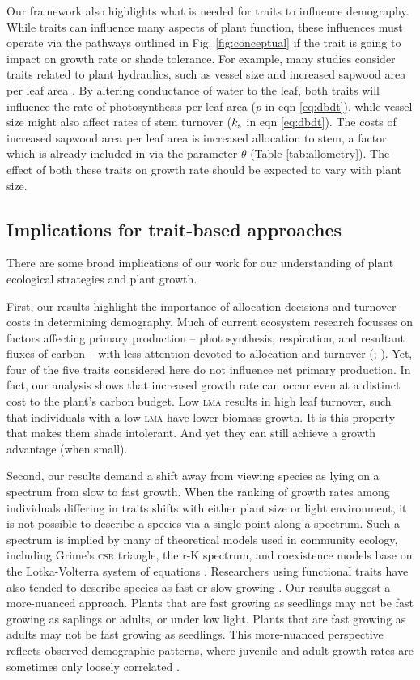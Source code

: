 \documentclass[9pt,twocolumn,twoside,lineno]{pnas-new}
\newcommand{\lma}{\textsc{lma}}
\begin{document}
Our framework also highlights what is needed for traits to influence demography. While traits can influence many aspects of plant function, these influences must operate via the pathways outlined in Fig. \ref{fig:conceptual} if the trait is going to impact on growth rate or shade tolerance. For example, many studies consider traits related to plant hydraulics, such as vessel size and increased sapwood area per leaf area \citep{Zanne-2010}. By altering conductance of water to the leaf, both traits will influence the rate of photosynthesis per leaf area ($\bar{p}$ in eqn \ref{eq:dbdt}), while vessel size might also affect rates of stem turnover ($k_{\rm s}$ in eqn \ref{eq:dbdt}). The costs of increased sapwood area per leaf area is increased allocation to stem, a factor which is already included in via the parameter $\theta$ (Table \ref{tab:allometry}). The effect of both these traits on growth rate should be expected to vary with plant size.

\subsection{Implications for trait-based approaches}
There are some broad implications of our work for our understanding of plant ecological strategies and plant growth.

First, our results highlight the importance of allocation decisions and turnover costs in determining demography. Much of current ecosystem research focusses on factors affecting primary production -- photosynthesis, respiration, and resultant fluxes of carbon -- with less attention devoted to allocation and turnover (\citealp{Friend-2014}; \citealp[for comparisons of models see][]{Sitch-2008, DeKauwe-2014}). Yet, four of the five traits considered here do not influence net primary production. In fact, our analysis shows that increased growth rate can occur even at a distinct cost to the plant's carbon budget. Low {\lma} results in high leaf turnover, such that individuals with a low {\lma} have lower biomass growth. It is this property that makes them shade intolerant. And yet they can still achieve a growth advantage (when small).

Second, our results demand a shift away from viewing species as lying on a spectrum  from slow to fast growth. When the ranking of growth rates among individuals differing in traits shifts with either plant size or light environment, it is not possible to describe a species via a single point along a spectrum. Such a spectrum is implied by many of theoretical models used in community ecology, including Grime's \textsc{csr} triangle, the r-K spectrum, and coexistence models base on the Lotka-Volterra system of equations \citep[e.g.][]{Grime-1977,Chesson-2000}. Researchers using functional traits have also tended to describe species as fast or slow growing \citep{Adler-2014, Diaz-2016}. Our results suggest a more-nuanced approach. Plants that are fast growing as seedlings may not be fast growing as saplings or adults, or under low light. Plants that are fast growing as adults may not be fast growing as seedlings. This more-nuanced perspective reflects observed demographic patterns, where juvenile and adult growth rates are sometimes only loosely correlated \citep{Rees-2001}.
\end{document}
